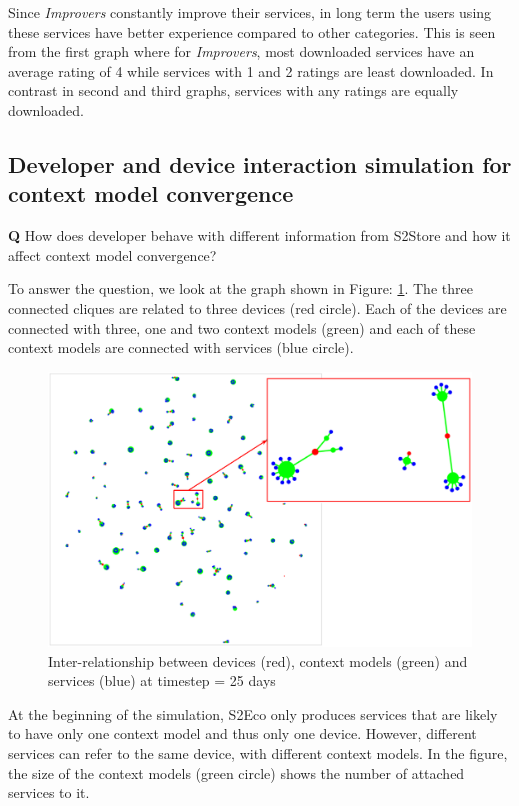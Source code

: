 Since \emph{Improvers} constantly improve their services, in long term the users using these services have better experience compared to other categories. This is seen from the first graph where for \emph{Improvers}, most downloaded services have an average rating of 4 while services with 1 and 2 ratings are least downloaded. In contrast in second and third graphs, services with any ratings are equally downloaded.

\subsection{Developer and device interaction simulation for context model convergence}

\textbf{Q} How does developer behave with different information from S2Store and how it affect context model convergence?

To answer the question, we look at the graph shown in Figure: \ref{fig:result_component_relationship}. The three connected cliques are related to three devices (red circle). Each of the devices are connected with three, one and two context models (green) and each of these context models are connected with services (blue circle).

\begin{figure}[!htb]
  \centering
  \includegraphics[width=13cm]{figures/result_component_relationship.pdf}
  \caption{Inter-relationship between devices (red), context models (green) and services (blue) at timestep = 25 days}
  \label{fig:result_component_relationship}
\end{figure}

At the beginning of the simulation, S2Eco only produces services that are likely to have only one context model and thus only one device. However, different services can refer to the same device, with different context models. In the figure, the size of the context models (green circle) shows the number of attached services to it.

